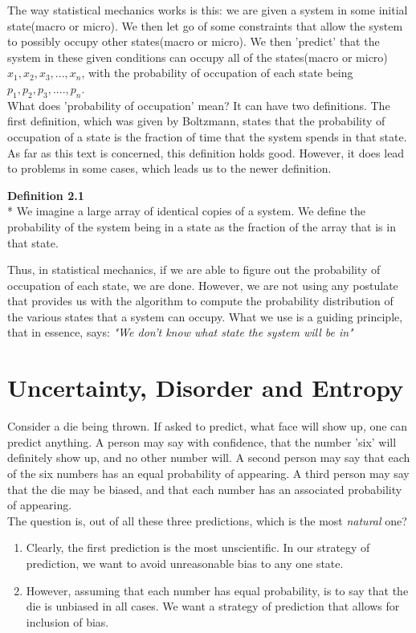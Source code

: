 \documentclass[oneside]{book}
\begin{document}
The way statistical mechanics works is this: we are given a system in some initial state(macro or micro). We then let go of some constraints that allow the system to possibly occupy other states(macro or micro). We then 'predict' that the system in these given conditions can occupy all of the states(macro or micro) $x_1,x_2,x_3,...,x_n$, with the probability of occupation of each state being $p_1,p_2,p_3,....,p_n$.\\

What does 'probability of occupation' mean? It can have two definitions. The first definition, which was given by Boltzmann, states that the probability of occupation of a state is the fraction of time that the system spends in that state. As far as this text is concerned, this definition holds good. However, it does lead to problems in some cases, which leads us to the newer definition.\\

\begin{mdframed}[style=exercise]
\textbf{Definition 2.1}
 \\* We imagine a large array of identical copies of a system. We define the probability of the system being in a state as the fraction of the array that is in that state.
 \end{mdframed}
 
Thus, in statistical mechanics, if we are able to figure out the probability of occupation of each state, we are done. However, we are not using any postulate that provides us with the algorithm to compute the probability distribution of the various states that a system can occupy. What we use is a guiding principle, that in essence, says: \emph{"We don't know what state the system will be in"}

\section{Uncertainty, Disorder and Entropy}
Consider a die being thrown. If asked to predict, what face will show up, one can predict anything. A person may say with confidence, that the number 'six' will definitely show up, and no other number will. A second person may say that each of the six numbers has an equal probability of appearing. A third person may say that the die may be biased, and that each number has an associated probability of appearing.\\

The question is, out of all these three predictions, which is the most \emph{natural} one?
\begin{enumerate}
\item Clearly, the first prediction is the most unscientific. In our strategy of prediction, we want to avoid unreasonable bias to any one state.
\item However, assuming that each number has equal probability, is to say that the die is unbiased in all cases. We want a strategy of prediction that allows for inclusion of bias.
\end{enumerate}
\end{document}
